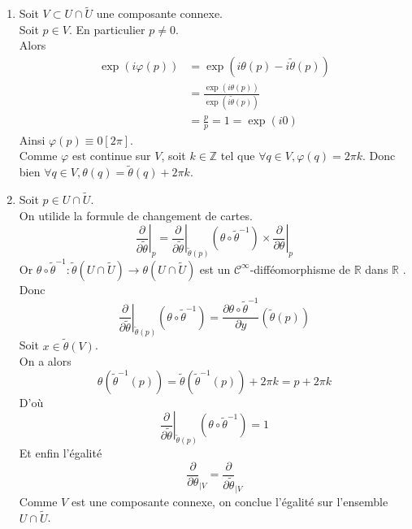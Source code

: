 \documentclass[../exercices.tex]{subfiles}
\begin{document}
	\begin{enumerate}
		\item Soit $V \subset U \cap \tilde{U}$ une composante connexe. \\
			Soit $p \in V$. En particulier $p \neq 0$. \\
			Alors
			$$
				\begin{aligned}
					\exp(i \varphi(p)) & = \exp(i \theta(p) - i \tilde{\theta}(p)) \\
					& = \frac{\exp(i \theta(p))}{\exp(i \tilde{\theta}(p))} \\
					& = \frac{p}{p} = 1 = \exp(i 0)
				\end{aligned}
			$$
			Ainsi $\varphi(p) \equiv 0 [2 \pi]$. \\
			Comme $\varphi$ est continue sur $V$, soit $k \in \mathbb{Z}$ tel que $\forall q \in V, \varphi(q) = 2 \pi k$. Donc bien $\forall q \in V, \theta(q) = \tilde{\theta}(q) + 2 \pi k$.
		\item Soit $p \in U \cap \tilde{U}$. \\
			On utilide la formule de changement de cartes.
			$$
				\left. \frac{\partial}{\partial \tilde{\theta}} \right|_{p} = \left. \frac{\partial}{\partial \tilde{\theta}} \right|_{\tilde{\theta}(p)}(\theta \circ \tilde{\theta}^{-1}) \times \left. \frac{\partial}{\partial \theta} \right|_{p}
			$$
			Or $\theta \circ \tilde{\theta}^{-1} : \tilde{\theta}(U \cap \tilde{U}) \longrightarrow \theta(U \cap \tilde{U})$ est un $\mathscr{C}^{\infty}$-difféomorphisme de \flqq{} $\mathbb{R}$ dans $\mathbb{R}$ \frqq{}. \\
			Donc
			$$
				\left. \frac{\partial}{\partial \tilde{\theta}} \right|_{\tilde{\theta}(p)}(\theta \circ \tilde{\theta}^{-1}) = \frac{\partial \theta \circ \tilde{\theta}^{-1}}{\partial y}(\tilde{\theta}(p))
			$$
			Soit $x \in \tilde{\theta}(V)$. \\
			On a alors
			$$
				\theta(\tilde{\theta}^{-1}(p)) = \tilde{\theta}(\tilde{\theta}^{-1}(p)) + 2 \pi k = p + 2 \pi k
			$$
			D'où
			$$
				\left. \frac{\partial}{\partial \tilde{\theta}} \right|_{\tilde{\theta}(p)}(\theta \circ \tilde{\theta}^{-1}) = 1
			$$
			Et enfin l'égalité
			$$
				\frac{\partial}{\partial \theta}_{| V} = \frac{\partial}{\partial \tilde{\theta}}_{| V}
			$$
			Comme $V$ est une composante connexe, on conclue l'égalité sur l'ensemble $U \cap \tilde{U}$.

	\end{enumerate}
\end{document}
